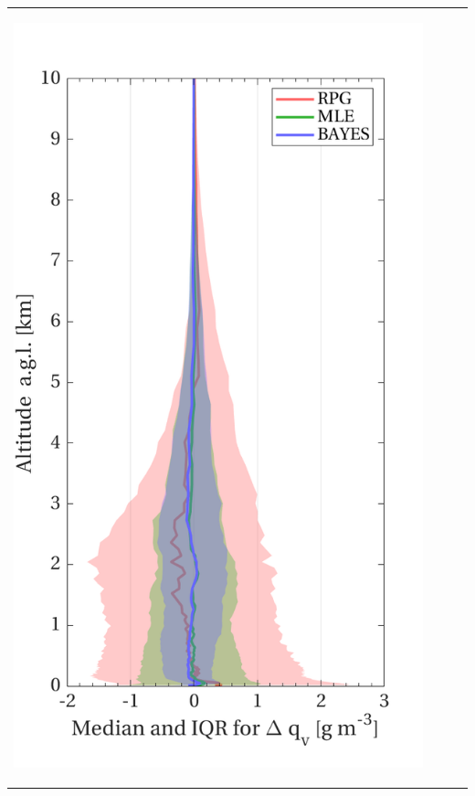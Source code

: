 \documentclass[landscape,paperwidth=1189mm,paperheight=841mm,fontscale=0.4,margin=.7cm]{baposter}
\begin{document}
\begin{poster}
{\begin{tabular}{ll|ll}
\begin{minipage}{0.14\linewidth}
\begin{center}
			\includegraphics[width=.99\linewidth]{QV_media_IQR_prof.png}	
		\end{center}
	\end{minipage}
	&
	\hspace*{-3em}
	\begin{minipage}{0.35\linewidth}
		

\end{minipage}
\end{tabular}}
\end{poster}
\end{document}
